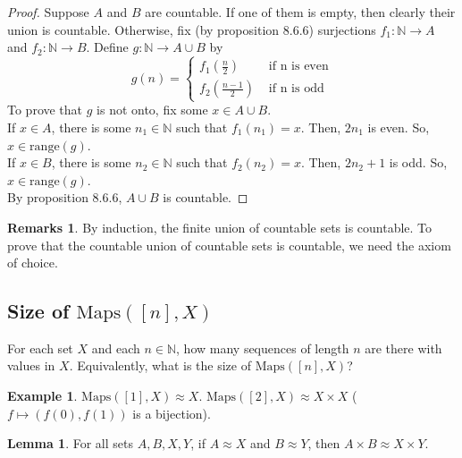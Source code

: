 \documentclass[14pt]{article}
\theoremstyle{definition}
\newtheorem*{remark}{Remarks}
\newtheorem*{example}{Example}
\newtheorem{lemma}[definition]{Lemma}
\newcommand{\fun}[3]{#1\colon #2\rightarrow#3}
\newcommand{\bb}[1]{\mathbb{#1}}
\begin{document}
\begin{proof}
    Suppose $A$ and $B$ are countable. If one of them is empty, then clearly their union is countable. Otherwise,
    fix (by proposition 8.6.6) surjections $\fun{f_1}{\bb{N}}{A}$ and $\fun{f_2}{\bb{N}}{B}$.
    Define $\fun{g}{\bb{N}}{A\cup B}$ by 
    \begin{equation*}
        g(n)=
        \begin{cases}
            f_1(\frac{n}{2}) & \text{ if n is even}\\
            f_2(\frac{n-1}{2}) & \text{ if n is odd}
        \end{cases}
    \end{equation*} 
    To prove that $g$ is not onto, fix some $x\in A\cup B$.\\
    If $x\in A$, there is some $n_1\in \bb{N}$ such that $f_1(n_1)=x$. Then, $2n_1$ is even. So, $x\in \mathrm{range}(g)$.\\
    If $x\in B$, there is some $n_2\in\bb{N} $ such that $f_2(n_2)=x$. Then, $2n_2+1$ is odd. So, $x\in\mathrm{range}(g)$.\\
    By proposition 8.6.6, $A\cup B$ is countable.

\end{proof}

\begin{remark}
    By induction, the finite union of countable sets is countable. To prove that the countable union
    of countable sets is countable, we need the axiom of choice. 
\end{remark}

\hspace{5mm}

\subsection{Size of $\mathrm{Maps}([n], X)$} 
For each set $X$ and each $n\in \bb{N}$, how many sequences of length $n$ are there with values in 
$X$.  Equivalently, what is the size of  $\mathrm{Maps}([n], X)$?

\begin{example}
    $\mathrm{Maps}([1], X)\approx X$. $\mathrm{Maps}([2], X)\approx X\times X$ ($f\mapsto (f(0), f(1))$ is a bijection). 
\end{example}

\vspace{2mm}

\begin{lemma}
    For all sets $A, B, X, Y$, if $A\approx X$ and $B\approx Y$, then $A\times B\approx X\times Y$.
\end{lemma}
\end{document}
